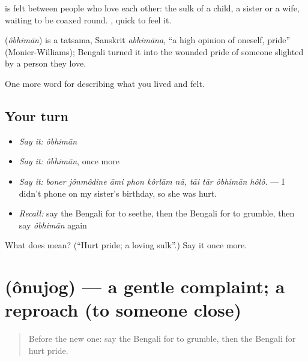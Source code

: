  is felt between people who love each other: the sulk of a child, a sister or a wife, waiting to be coaxed round. , quick to feel it.

\begin{cousinweb}
\textbf{} (\emph{ôbhimān}) is a tatsama, Sanskrit \emph{abhimāna}, \textquotedblleft{}a high opinion of oneself, pride\textquotedblright{} (Monier-Williams); Bengali turned it into the wounded pride of someone slighted by a person they love.
\end{cousinweb}

\begin{grammarlens}[title={What you've built}]
One more word for describing what you lived and felt.
\end{grammarlens}

\subsection*{Your turn}
\begin{itemize}
\raggedright
  \item \emph{Say it:} \emph{ôbhimān}
  \item \emph{Say it:} \emph{ôbhimān}, once more
  \item \emph{Say it:} \emph{boner jônmôdine āmi phon kôrlām nā, tāi tār ôbhimān hôlô.} — I didn't phone on my sister's birthday, so she was hurt.
  \item \emph{Recall:} say the Bengali for to seethe, then the Bengali for to grumble, then say \emph{ôbhimān} again
\end{itemize}

\begin{tcolorbox}[breakable,colback=teal!4,colframe=teal!35!black,title={Before you move on}]
What does  mean? (\textquotedblleft{}Hurt pride; a loving sulk\textquotedblright{}.) Say it once more.
\end{tcolorbox}
\section[\texorpdfstring{\bn{অনুযোগ} (ônujog)}{অনুযোগ (ônujog)}]{ (ônujog) — a gentle complaint; a reproach (to someone close)}

\label{lesson:BN-C444-onujog}



\begin{quote}
Before the new one: say the Bengali for to grumble, then the Bengali for hurt pride.
\end{quote}

